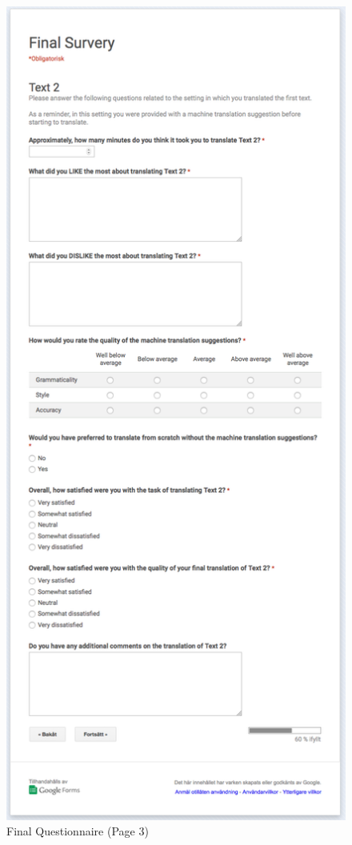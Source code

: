 \begin{figure}[h]
\myfloatalign
\includegraphics[height=\textheight]{img/final_questionnaire/final_3.png}
\caption{Final Questionnaire (Page 3)}
\end{figure}

